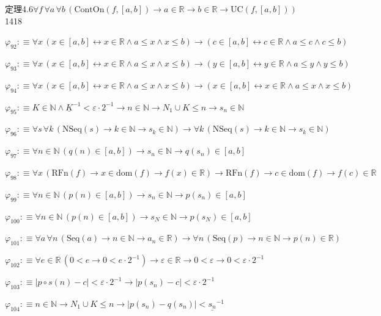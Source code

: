 \begin{fullproof}{定理4.6}{$\forall f\,\forall a\,\forall b\,(\mathrm{ContOn}(f,[a,b]) \to a \in \mathbb{R} \to b \in \mathbb{R} \to \mathrm{UC}(f,[a,b]))$}{1418}
\begin{abbrevlist}
\item $\varphi_{92} :\equiv \forall x\,(x \in [a,b] \leftrightarrow x \in \mathbb{R} \land a \leq x \land x \leq b) \to (c \in [a,b] \leftrightarrow c \in \mathbb{R} \land a \leq c \land c \leq b)$
\item $\varphi_{93} :\equiv \forall x\,(x \in [a,b] \leftrightarrow x \in \mathbb{R} \land a \leq x \land x \leq b) \to (y \in [a,b] \leftrightarrow y \in \mathbb{R} \land a \leq y \land y \leq b)$
\item $\varphi_{94} :\equiv \forall x\,(x \in [a,b] \leftrightarrow x \in \mathbb{R} \land a \leq x \land x \leq b) \to (x \in [a,b] \leftrightarrow x \in \mathbb{R} \land a \leq x \land x \leq b)$
\item $\varphi_{95} :\equiv K \in \mathbb{N} \land \underline{K}^{-1} < \varepsilon \cdot 2^{-1} \to n \in \mathbb{N} \to N_{1} \cup K \leq n \to s_{n} \in \mathbb{N}$
\item $\varphi_{96} :\equiv \forall s\,\forall k\,(\mathrm{NSeq}(s) \to k \in \mathbb{N} \to s_{k} \in \mathbb{N}) \to \forall k\,(\mathrm{NSeq}(s) \to k \in \mathbb{N} \to s_{k} \in \mathbb{N})$
\item $\varphi_{97} :\equiv \forall n \in \mathbb{N}\,(q(n) \in [a,b]) \to s_{n} \in \mathbb{N} \to q(s_{n}) \in [a,b]$
\item $\varphi_{98} :\equiv \forall x\,(\mathrm{RFn}(f) \to x \in \mathrm{dom}(f) \to f(x) \in \mathbb{R}) \to \mathrm{RFn}(f) \to c \in \mathrm{dom}(f) \to f(c) \in \mathbb{R}$
\item $\varphi_{99} :\equiv \forall n \in \mathbb{N}\,(p(n) \in [a,b]) \to s_{n} \in \mathbb{N} \to p(s_{n}) \in [a,b]$
\item $\varphi_{100} :\equiv \forall n \in \mathbb{N}\,(p(n) \in [a,b]) \to s_{N} \in \mathbb{N} \to p(s_{N}) \in [a,b]$
\item $\varphi_{101} :\equiv \forall a\,\forall n\,(\mathrm{Seq}(a) \to n \in \mathbb{N} \to a_{n} \in \mathbb{R}) \to \forall n\,(\mathrm{Seq}(p) \to n \in \mathbb{N} \to p(n) \in \mathbb{R})$
\item $\varphi_{102} :\equiv \forall e \in \mathbb{R}\,(0 < e \to 0 < e \cdot 2^{-1}) \to \varepsilon \in \mathbb{R} \to 0 < \varepsilon \to 0 < \varepsilon \cdot 2^{-1}$
\item $\varphi_{103} :\equiv \lvert p \circ s(n) - c \rvert < \varepsilon \cdot 2^{-1} \to \lvert p(s_{n}) - c \rvert < \varepsilon \cdot 2^{-1}$
\item $\varphi_{104} :\equiv n \in \mathbb{N} \to N_{1} \cup K \leq n \to \lvert p(s_{n}) - q(s_{n}) \rvert < \underline{s_{n}}^{-1}$

\end{abbrevlist}
\end{fullproof}

